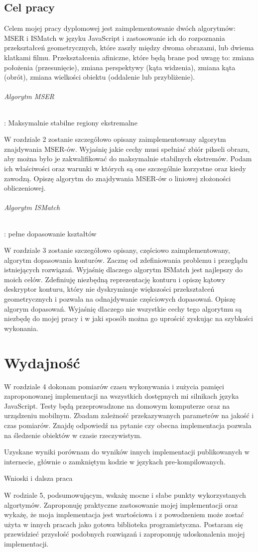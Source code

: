 \documentclass[a4paper,12pt,polski]{report}
\begin{document}
\section{Cel pracy}

Celem mojej pracy dyplomowej jest zaimplementowanie dwóch algorytmów: MSER i
ISMatch w języku JavaScript i zastosowanie ich do rozpoznania przekształceń
geometrycznych, które zaszły między dwoma obrazami, lub dwiema klatkami filmu.
Przekształcenia afiniczne, które będą brane pod uwagę to: zmiana położenia
(przesunięcie), zmiana perspektywy (kąta widzenia), zmiana kąta (obrót), zmiana
wielkości obiektu (oddalenie lub przybliżenie).

\subparagraph{Algorytm MSER}: Maksymalnie stabilne regiony ekstremalne

W rozdziale 2 zostanie szczegółowo opisany zaimplementowany algorytm
znajdywania MSER-ów. Wyjaśnię jakie cechy musi spełniać zbiór pikseli obrazu,
aby można było je zakwalifikować do maksymalnie stabilnych ekstremów.  Podam
ich właściwości oraz warunki w których są one szczególnie korzystne oraz kiedy
zawodzą. Opiszę algorytm do znajdywania MSER-ów o liniowej złożoności
obliczeniowej.

\subparagraph{Algorytm ISMatch}: pełne dopasowanie kształtów

W rozdziale 3 zostanie szczegółowo opisany, częściowo zaimplementowany,
algorytm dopasowania konturów. Zacznę od zdefiniowania problemu i przeglądu
istniejących rozwiązań. Wyjaśnię dlaczego algorytm ISMatch jest najlepszy do
moich celów. Zdefiniuję niezbędną reprezentację konturu i opiszę kątowy
deskryptor konturu, który nie dyskryminuje większości przekształceń
geometrycznych i pozwala na odnajdywanie częściowych dopasowań. Opiszę algorym
dopasowań.  Wyjaśnię dlaczego nie wszystkie cechy tego algorytmu są niezbędę do
mojej pracy i w jaki sposób można go uprościć zyskując na szybkości wykonania.

\chapter{Wydajność}

W rozdziale 4 dokonam pomiarów czasu wykonywania i zużycia pamięci
zaproponowanej implementacji na wszystkich dostępnych mi silnikach języka
JavaScript. Testy będą przeprowadzone na domowym komputerze oraz na urządzeniu
mobilnym.  Zbadam zależność przekazywanych parametrów na jakość i czas
pomiarów. Znajdę odpowiedź na pytanie czy obecna implementacja pozwala na
śledzenie obiektów w czasie rzeczywistym.

Uzyskane wyniki porównam do wyników innych implementacji publikowanych w
internecie, głównie o zamkniętym kodzie w językach pre-kompilowanych.

Wnioski i dalsza praca

W rodziale 5, podsumowującym, wskażę mocne i słabe punkty wykorzystanych
algortymów. Zaproponuję praktyczne zastosowanie mojej implementacji oraz
wykażę, że moja implementacja jest wartościowa i z powodzeniem może zostać
użyta w innych pracach jako gotowa biblioteka programistyczna. Postaram się
przewidzieć przysłość podobnych rozwiązań i zaproponuję udoskonalenia mojej
implementacji.
\end{document}
